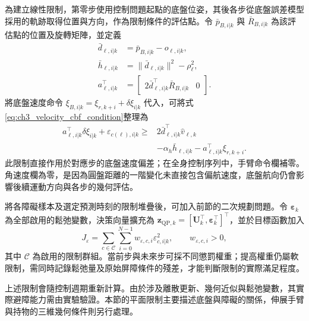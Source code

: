 為建立線性限制，第零步使用控制問題起點的底盤位姿，其後各步從底盤誤差模型採用的軌跡取得位置與方向，作為限制條件的評估點。令 $\bar{p}_{B,i|k}$ 與 $\bar{R}_{B,i|k}$ 為該評估點的位置及旋轉矩陣，並定義
\begin{equation}
    \begin{aligned}
        \bar{d}_{\ell,i|k}
        &=\bar{p}_{B,i|k}-o_{\ell,i|k}, \\
        \bar{h}_{\ell,i|k}
        &=\|\bar{d}_{\ell,i|k}\|^2-\rho_{\ell}^{2}, \\
        a_{\ell,i|k}^{\top}
        &=\begin{bmatrix}
            2\bar{d}_{\ell,i|k}^{\top}\bar{R}_{B,i|k} & 0
          \end{bmatrix}.
    \end{aligned}
    \label{eq:ch3_cbf_nominal_geometry}
\end{equation}
將底盤速度命令 $\xi_{B,i|k}=\xi_{r,k+i}+\delta\xi_{i|k}$ 代入，可將式\eqref{eq:ch3_velocity_cbf_condition}整理為
\begin{equation}
    \begin{aligned}
        a_{\ell,i|k}^{\top}\delta\xi_{i|k}
        +\varepsilon_{c(\ell),i|k}
        \geq{}&2\bar{d}_{\ell,i|k}^{\top}\hat{v}_{\ell,k} \\
               &-\alpha_h\bar{h}_{\ell,i|k}
                -a_{\ell,i|k}^{\top}\xi_{r,k+i}.
    \end{aligned}
    \label{eq:ch3_cbf_affine_constraint}
\end{equation}
此限制直接作用於對應步的底盤速度偏差；在全身控制序列中，手臂命令欄補零。角速度欄為零，是因為圓盤距離的一階變化未直接包含偏航速度，底盤航向仍會影響後續運動方向與各步的幾何評估。

將各障礙樣本及選定預測時刻的限制堆疊後，可加入前節的二次規劃問題。令 $\boldsymbol{\varepsilon}_k$ 為全部啟用的鬆弛變數，決策向量擴充為 $\mathbf{z}_{\mathrm{QP},k}=[\mathbf{U}_k^{\top},\boldsymbol{\varepsilon}_k^{\top}]^{\top}$，並於目標函數加入
\begin{equation}
    J_{\varepsilon}
    =\sum_{c\in\mathcal{C}}\sum_{i=0}^{N-1}
      w_{\varepsilon,c,i}\varepsilon_{c,i|k}^{2},
    \qquad w_{\varepsilon,c,i}>0,
    \label{eq:ch3_cbf_slack_cost}
\end{equation}
其中 $\mathcal{C}$ 為啟用的限制群組。當前步與未來步可採不同懲罰權重；提高權重仍屬軟限制，需同時記錄鬆弛量及原始屏障條件的殘差，才能判斷限制的實際滿足程度。

上述限制會隨控制週期重新計算。由於涉及離散更新、幾何近似與鬆弛變數，其實際避障能力需由實驗驗證。本節的平面限制主要描述底盤與障礙的關係，伸展手臂與持物的三維幾何條件則另行處理。

